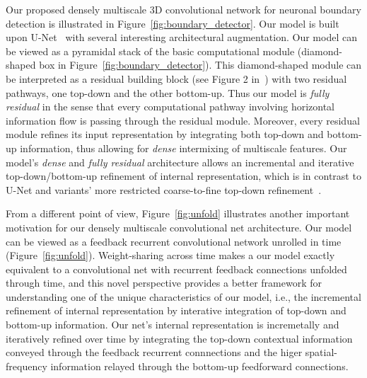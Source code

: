 \documentclass{article}
\begin{document}
Our proposed densely multiscale 3D convolutional network for neuronal boundary
detection is illustrated in Figure~\ref{fig:boundary_detector}. Our model is
built upon U-Net~\cite{unet} with several interesting architectural
augmentation. Our model can be viewed as a pyramidal stack of the basic
computational module (diamond-shaped box in Figure~\ref{fig:boundary_detector}).
This diamond-shaped module can be interpreted as a residual building block (see
Figure 2 in~\cite{resnet}) with two residual pathways, one top-down and the
other bottom-up. Thus our model is \emph{fully residual} in the sense that every
computational pathway involving horizontal information flow is passing through
the residual module. Moreover, every residual module refines its input
representation by integrating both top-down and bottom-up information, thus
allowing for \emph{dense} intermixing of multiscale features. Our model's
\emph{dense} and \emph{fully residual} architecture allows an incremental and
iterative top-down/bottom-up refinement of internal representation, which is in
contrast to U-Net and variants' more restricted coarse-to-fine top-down
refinement~\cite{pinheiro2016refine,lin2016pyramid}.

From a different point of view, Figure~\ref{fig:unfold} illustrates another
important motivation for our densely multiscale convolutional net architecture.
Our model can be viewed as a feedback recurrent convolutional network unrolled
in time (Figure~\ref{fig:unfold}). Weight-sharing across time makes a our model
exactly equivalent to a convolutional net with recurrent feedback connections
unfolded through time, and this novel perspective provides a better framework
for understanding one of the unique characteristics of our model, i.e., the
incremental refinement of internal representation by interative integration of
top-down and bottom-up information. Our net's internal representation is
incremetally and iteratively refined over time by integrating the top-down
contextual information conveyed through the feedback recurrent connnections and
the higer spatial-frequency information relayed through the bottom-up
feedforward connections.
\end{document}
